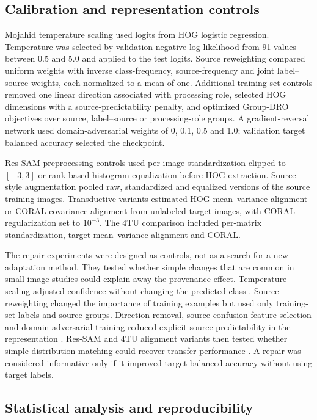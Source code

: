 \documentclass[]{interact}
\begin{document}
\subsection{Calibration and representation controls}

Mojahid temperature scaling used logits from HOG logistic regression. Temperature was selected by validation negative log likelihood from 91 values between 0.5 and 5.0 and applied to the test logits. Source reweighting compared uniform weights with inverse class-frequency, source-frequency and joint label--source weights, each normalized to a mean of one. Additional training-set controls removed one linear direction associated with processing role, selected HOG dimensions with a source-predictability penalty, and optimized Group-DRO objectives over source, label--source or processing-role groups. A gradient-reversal network used domain-adversarial weights of 0, 0.1, 0.5 and 1.0; validation target balanced accuracy selected the checkpoint.

Res-SAM preprocessing controls used per-image standardization clipped to $[-3,3]$ or rank-based histogram equalization before HOG extraction. Source-style augmentation pooled raw, standardized and equalized versions of the source training images. Transductive variants estimated HOG mean--variance alignment or CORAL covariance alignment from unlabeled target images, with CORAL regularization set to $10^{-3}$. The 4TU comparison included per-matrix standardization, target mean--variance alignment and CORAL.

The repair experiments were designed as controls, not as a search for a new adaptation method. They tested whether simple changes that are common in small image studies could explain away the provenance effect. Temperature scaling adjusted confidence without changing the predicted class \cite{guo2017calibration}. Source reweighting changed the importance of training examples but used only training-set labels and source groups. Direction removal, source-confusion feature selection and domain-adversarial training reduced explicit source predictability in the representation \cite{ganin2016domain}. Res-SAM and 4TU alignment variants then tested whether simple distribution matching could recover transfer performance \cite{sun2016coral}. A repair was considered informative only if it improved target balanced accuracy without using target labels.

\subsection{Statistical analysis and reproducibility}
\end{document}
